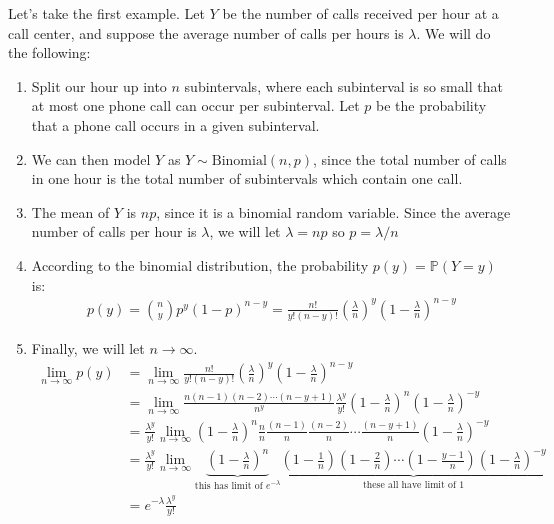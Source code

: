 \documentclass[12pt]{article}
\theoremstyle{definition}
\theoremstyle{remark}
\def\P{{\mathbb P}}
\begin{document}
Let's take the first example. Let $Y$ be the number of calls received per hour at a call center, and suppose the average number of calls per hours is $\lambda$. We will do the following:
\begin{enumerate}
\item Split our hour up into $n$ subintervals, where each subinterval is so small that at most one phone call can occur per subinterval. Let $p$ be the probability that a phone call occurs in a given subinterval. 
\item We can then model $Y$ as $Y \sim \text{Binomial}(n, p)$, since the total number of calls in one hour is the total number of subintervals which contain one call.
\item The mean of $Y$ is $np$, since it is a binomial random variable. Since the average number of calls per hour is $\lambda$, we will let $\lambda = np$ so $p = \lambda / n$
\item According to the binomial distribution, the probability $p(y) = \P(Y = y)$ is:
\begin{align*}
p(y) = \binom{n}{y} p^y(1-p)^{n-y} = \frac{n!}{y!(n-y)!}\left(\frac{\lambda}{n}\right)^y\left(1 - \frac{\lambda}{n}\right)^{n-y}
\end{align*}
\item Finally, we will let $n \rightarrow \infty$.
\begin{align*}
\lim_{n \rightarrow \infty} p(y) &= \lim_{n \rightarrow \infty} \frac{n!}{y!(n-y)!}\left(\frac{\lambda}{n}\right)^y\left(1 - \frac{\lambda}{n}\right)^{n-y}\\
&= \lim_{n \rightarrow \infty} \frac{n(n-1)(n-2)\cdots(n - y + 1 )}{n^y}\frac{\lambda^y}{y!}\left(1 - \frac{\lambda}{n}\right)^n \left(1 - \frac{\lambda}{n}\right)^{-y}\\
&= \frac{\lambda^y}{y!} \lim_{n \rightarrow \infty} \left(1 - \frac{\lambda}{n}\right)^n \frac{n}{n}\frac{(n-1)}{n}\frac{(n-2)}{n}\cdots\frac{(n - y + 1)}{n} \left(1 - \frac{\lambda}{n}\right)^{-y}\\
&= \frac{\lambda^y}{y!} \lim_{n \rightarrow \infty} \underbrace{\left(1 - \frac{\lambda}{n}\right)^n}_{\text{this has limit of }e^{-\lambda}} \underbrace{\left(1 - \frac{1}{n}\right)\left(1 - \frac{2}{n}\right)\cdots\left(1 - \frac{y - 1}{n}\right) \left(1 - \frac{\lambda}{n}\right)^{-y}}_{\text{these all have limit of 1}}\\
&= e^{-\lambda}\frac{\lambda^y}{y!}
\end{align*}
\end{enumerate}
\end{document}
